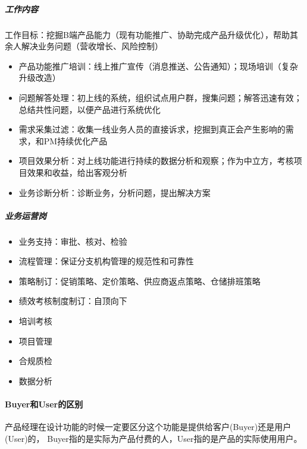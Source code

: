 \documentclass[letterpaper,11pt,english]{sphinxmanual}
\begin{document}
\subparagraph{工作内容}
\label{\detokenize{chapter_introduction/2B:id27}}
工作目标：挖掘B端产品能力（现有功能推广、协助完成产品升级优化），帮助其余人解决业务问题（营收增长、风险控制）
\begin{itemize}
\item {} 
产品功能推广培训：线上推广宣传（消息推送、公告通知）；现场培训（复杂升级改造）

\item {} 
问题解答处理：初上线的系统，组织试点用户群，搜集问题；解答迅速有效；总结共性问题，以便产品进行系统优化

\item {} 
需求采集过滤：收集一线业务人员的直接诉求，挖掘到真正会产生影响的需求，和PM持续优化产品

\item {} 
项目效果分析：对上线功能进行持续的数据分析和观察；作为中立方，考核项目效果和收益，给出客观分析

\item {} 
业务诊断分析：诊断业务，分析问题，提出解决方案

\end{itemize}


\subparagraph{业务运营岗}
\label{\detokenize{chapter_introduction/2B:id28}}\begin{itemize}
\item {} 
业务支持：审批、核对、检验

\item {} 
流程管理：保证分支机构管理的规范性和可靠性

\item {} 
策略制订：促销策略、定价策略、供应商返点策略、仓储排班策略

\item {} 
绩效考核制度制订：自顶向下

\item {} 
培训考核

\item {} 
项目管理

\item {} 
合规质检

\item {} 
数据分析

\end{itemize}


\paragraph{Buyer和User的区别}
\label{\detokenize{chapter_introduction/2B:buyeruser}}
产品经理在设计功能的时候一定要区分这个功能是提供给客户(Buyer)还是用户(User)的，
Buyer指的是实际为产品付费的人，User指的是产品的实际使用用户。
\end{document}

